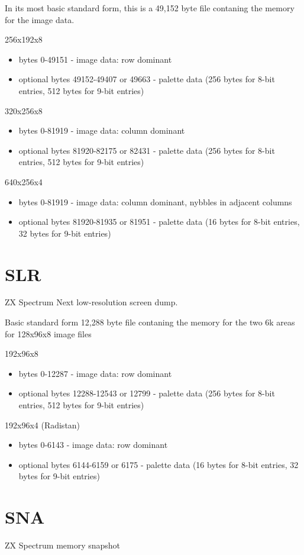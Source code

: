 In its most basic standard form, this is a 49,152 byte file contaning
the memory for the image data. 

256x192x8
\begin{itemize}
\item bytes 0-49151 - image data: row dominant
\item optional bytes 49152-49407 or 49663 - palette data (256 bytes
  for 8-bit entries, 512 bytes for 9-bit entries)
\end{itemize}
320x256x8
\begin{itemize}
\item bytes 0-81919 - image data: column dominant
\item optional bytes 81920-82175 or 82431 - palette data (256 bytes
  for 8-bit entries, 512 bytes for 9-bit entries)
\end{itemize}
640x256x4
\begin{itemize}
\item bytes 0-81919 - image data: column dominant, nybbles in adjacent columns
\item optional bytes 81920-81935 or 81951 - palette data (16 bytes for
  8-bit entries, 32 bytes for 9-bit entries)
\end{itemize}
\section{SLR}
ZX Spectrum Next low-resolution screen dump.

Basic standard form 12,288 byte file contaning the memory for the two
6k areas for 128x96x8 image files

192x96x8
\begin{itemize}
\item bytes 0-12287 - image data: row dominant
\item optional bytes 12288-12543 or 12799 - palette data (256 bytes
  for 8-bit entries, 512 bytes for 9-bit entries)
\end{itemize}
192x96x4 (Radistan)
\begin{itemize}
\item bytes 0-6143 - image data: row dominant
\item optional bytes 6144-6159 or 6175 - palette data (16 bytes for
  8-bit entries, 32 bytes for 9-bit entries)
\end{itemize}
\section{SNA}
ZX Spectrum memory snapshot
